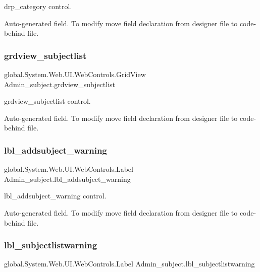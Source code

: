 drp\+\_\+category control. 

Auto-\/generated field. To modify move field declaration from designer file to code-\/behind file. \mbox{\label{class_admin__subject_a63e660f898fdb9a1f2164477d94207a1}} 
\subsubsection{\texorpdfstring{grdview\_subjectlist}{grdview\_subjectlist}}
{\footnotesize\ttfamily global.\+System.\+Web.\+U\+I.\+Web\+Controls.\+Grid\+View Admin\+\_\+subject.\+grdview\+\_\+subjectlist\hspace{0.3cm}{\ttfamily [protected]}}



grdview\+\_\+subjectlist control. 

Auto-\/generated field. To modify move field declaration from designer file to code-\/behind file. \mbox{\label{class_admin__subject_ab3901761a390377f74a2c75a3e622766}} 
\subsubsection{\texorpdfstring{lbl\_addsubject\_warning}{lbl\_addsubject\_warning}}
{\footnotesize\ttfamily global.\+System.\+Web.\+U\+I.\+Web\+Controls.\+Label Admin\+\_\+subject.\+lbl\+\_\+addsubject\+\_\+warning\hspace{0.3cm}{\ttfamily [protected]}}



lbl\+\_\+addsubject\+\_\+warning control. 

Auto-\/generated field. To modify move field declaration from designer file to code-\/behind file. \mbox{\label{class_admin__subject_a68f2389395ae842e18cf0ec9339b45a8}} 
\subsubsection{\texorpdfstring{lbl\_subjectlistwarning}{lbl\_subjectlistwarning}}
{\footnotesize\ttfamily global.\+System.\+Web.\+U\+I.\+Web\+Controls.\+Label Admin\+\_\+subject.\+lbl\+\_\+subjectlistwarning\hspace{0.3cm}{\ttfamily [protected]}}



